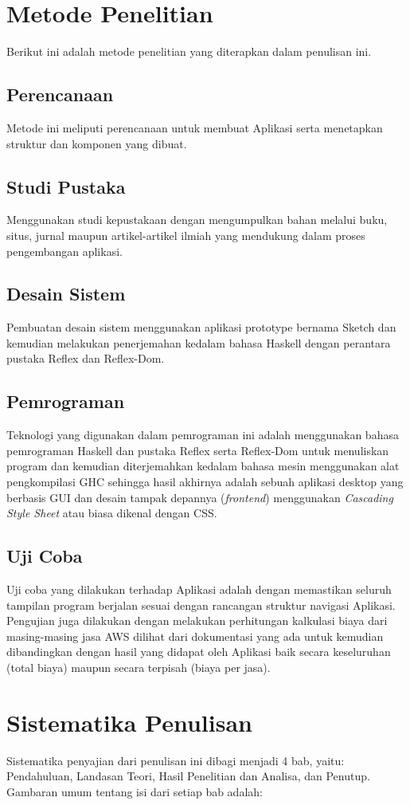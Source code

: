 \documentclass[pi.tex]{subfile}
\begin{document}
\section{Metode Penelitian}
Berikut ini adalah metode penelitian yang diterapkan dalam penulisan ini.

\subsection{Perencanaan}
Metode ini meliputi perencanaan untuk membuat Aplikasi serta menetapkan struktur dan komponen yang dibuat.
\subsection{Studi Pustaka}
Menggunakan studi kepustakaan dengan mengumpulkan bahan melalui buku, situs, jurnal maupun artikel-artikel ilmiah yang mendukung dalam proses pengembangan aplikasi.
\subsection{Desain Sistem}
Pembuatan desain sistem menggunakan aplikasi prototype bernama Sketch dan kemudian melakukan penerjemahan kedalam bahasa Haskell dengan perantara pustaka Reflex dan Reflex-Dom.
\subsection{Pemrograman}
Teknologi yang digunakan dalam pemrograman ini adalah menggunakan bahasa pemrograman Haskell dan pustaka Reflex serta Reflex-Dom untuk menuliskan program dan kemudian diterjemahkan kedalam bahasa mesin menggunakan alat pengkompilasi GHC sehingga hasil akhirnya adalah sebuah aplikasi desktop yang berbasis GUI dan desain tampak depannya (\emph{frontend}) menggunakan \emph{Cascading Style Sheet} atau biasa dikenal dengan CSS.
\subsection{Uji Coba}
Uji coba yang dilakukan terhadap Aplikasi adalah dengan memastikan seluruh tampilan program berjalan sesuai dengan rancangan struktur navigasi Aplikasi. Pengujian juga dilakukan dengan melakukan perhitungan kalkulasi biaya dari masing-masing jasa AWS dilihat dari dokumentasi yang ada untuk kemudian dibandingkan dengan hasil yang didapat oleh Aplikasi baik secara keseluruhan (total biaya) maupun secara terpisah (biaya per jasa).


\section{Sistematika Penulisan}
Sistematika penyajian dari penulisan ini dibagi menjadi 4 bab, yaitu: Pendahuluan, Landasan Teori, Hasil Penelitian dan Analisa, dan Penutup. Gambaran umum tentang isi dari setiap bab adalah:
\end{document}
